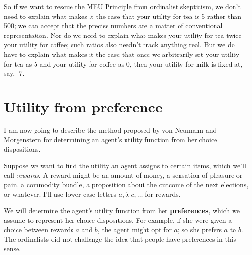 So if we want to rescue the MEU Principle from ordinalist skepticism,
we don't need to explain what makes it the case that your utility for
tea is 5 rather than 500; we can accept that the precise numbers are a
matter of conventional representation. Nor do we need to explain what
makes your utility for tea twice your utility for coffee; such ratios
also needn't track anything real. But we do have to explain what makes
it the case that once we arbitrarily set your utility for tea as 5 and
your utility for coffee as 0, then your utility for milk is fixed at,
say, -7.




\section{Utility from preference}

I am now going to describe the method proposed by von Neumann and
Morgenstern for determining an agent's utility function from her
choice dispositions.

Suppose we want to find  the utility an agent assigns to certain
items, which we'll call \emph{rewards}. A reward might be an amount of
money, a sensation of pleasure or pain, a commodity bundle, a
proposition about the outcome of the next elections, or whatever. I'll
use lower-case letters $a,b,c,\ldots$ for rewards. 

We will determine the agent's utility function from her
\textbf{preferences}, which we assume to represent her choice
dispositions. For example, if she were given a choice between rewards
$a$ and $b$, the agent might opt for $a$; so she prefers $a$ to
$b$. The ordinalists did not challenge the idea that people have
preferences in this sense.

